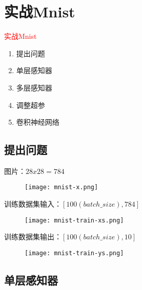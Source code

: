 \section{实战Mnist}
\label{sec:mnist}

\begin{frame}
  \begin{center}
    \Huge{\textcolor{red}{实战Mnist}}
  \end{center}

  \begin{enumerate}
    \item \alert{提出问题}
    \item \alert{单层感知器}
    \item \alert{多层感知器}    
    \item \alert{调整超参}
    \item \alert{卷积神经网络}        
  \end{enumerate}   
\end{frame}

\subsection{提出问题}

\begin{frame}{图片：$ 28x28 = 784 $}
  \begin{figure}
    \centering
    \texttt{[image: mnist-x.png]}
  \end{figure}
\end{frame}

\begin{frame}{训练数据集输入：$ [100(batch\_size), 784] $}
  \begin{figure}
    \centering
    \texttt{[image: mnist-train-xs.png]}
  \end{figure}
\end{frame}

\begin{frame}{训练数据集输出：$ [100(batch\_size), 10] $}
  \begin{figure}
    \centering
    \texttt{[image: mnist-train-ys.png]}
  \end{figure}
\end{frame}

\subsection{单层感知器}

